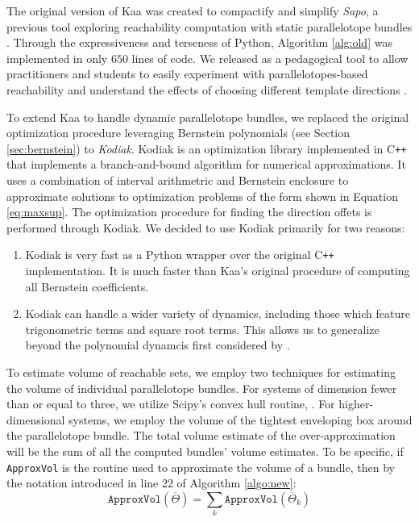 The original version of Kaa was created to compactify and simplify \emph{Sapo}, a previous tool exploring reachability computation with static parallelotope bundles \cite{dreossi2017sapo}.
%
Through the expressiveness and terseness of Python, Algorithm \ref{alg:old} was implemented in only $650$ lines of code.
%
We released as a pedagogical tool to allow practitioners and students to easily experiment with parallelotopes-based reachability and understand the effects of choosing different template directions \cite{kim2020kaa}.

To extend Kaa to handle dynamic parallelotope bundles, we replaced the original optimization procedure leveraging Bernstein polynomials (see Section \ref{sec:bernstein}) to \emph{Kodiak}.
%
%
Kodiak is an optimization library implemented in C\texttt{++} that implements a branch-and-bound algorithm for numerical approximations. It uses a combination of interval arithmetric and Bernstein enclosure to approximate solutions to optimization problems of the form shown in Equation \ref{eq:maxsup}.
%
The optimization procedure for finding the direction offets is performed through Kodiak.
%
We decided to use Kodiak primarily for two reasons:
%
\begin{enumerate}
  \item Kodiak is very fast as a Python wrapper over the original C\texttt{++} implementation. It is much faster than Kaa's original procedure of computing all Bernstein coefficients.
  \item Kodiak can handle a wider variety of dynamics, including those which feature trigonometric terms and square root terms. This allows us to generalize beyond the polynomial dynamcis first considered by \cite{dreossi2016parallelotope}.
\end{enumerate}
%

To estimate volume of reachable sets, we employ two techniques for estimating the volume of individual parallelotope bundles. For systems of dimension fewer than or equal to three, we utilize Scipy's convex hull routine, .
%
For higher-dimensional systems, we employ the volume of the tightest enveloping box around the parallelotope bundle.
%
The total volume estimate of the over-approximation will be the sum of all the computed bundles' volume estimates.
%
To be specific, if \texttt{ApproxVol} is the routine used to approximate the volume of a bundle, then by the notation introduced in line 22 of Algorithm \ref{algo:new}:
%
\begin{equation}
  \texttt{ApproxVol}(\overline\Theta) = \sum_{k} \texttt{ApproxVol}(\overline\Theta_k)
\end{equation}
